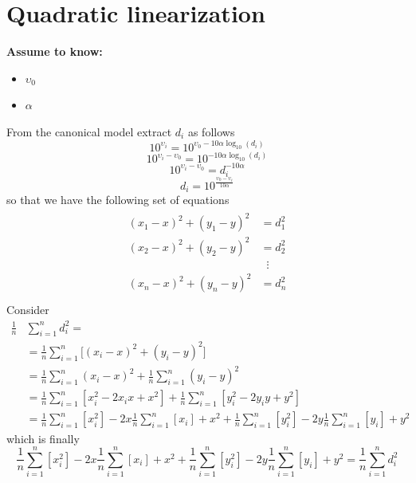 \documentclass[12pt,twoside]{report}
\begin{document}
\section{Quadratic linearization}
  \begin{center}
  \textbf{Assume to know:}
  \begin{itemize}
    \centering
    \item $\upsilon_0$
    \item $\alpha$
  \end{itemize}
  \end{center}
From the canonical model extract $d_i$ as follows
\begin{equation*}
    10^{\upsilon_{i}}=10^{\upsilon_0-10\alpha\log_{10}(d_i)}
\end{equation*}
\begin{equation*}
    10^{\upsilon_{i}-\upsilon_0}=10^{-10\alpha\log_{10}(d_i)}
\end{equation*}
\begin{equation*}
     10^{\upsilon_{i}-\upsilon_0}=d_i^{-10\alpha}
\end{equation*}
\begin{equation}
    d_i=10^{\frac{\upsilon_0-\upsilon_{i}}{10\alpha}}
    \label{eq:17}
\end{equation}
so that we have the following set of equations
\begin{align}
\begin{split} 
(x_1-x)^2+(y_1-y)^2&=d_1^2 \\ 
(x_2-x)^2+(y_2-y)^2&=d_2^2 \\ 
&\;\;\vdots\\
(x_n-x)^2+(y_n-y)^2&=d_n^2 \\
\end{split}
\label{eq:11}
\end{align}
Consider 
\begin{align}
\frac{1}{n}&\sum_{i=1}^nd_i^2=\\
&=\frac{1}{n}\sum_{i=1}^n\big[(x_i-x)^2+(y_i-y)^2\big]\\
&=\frac{1}{n}\sum_{i=1}^n(x_i-x)^2+\frac{1}{n}\sum_{i=1}^n(y_i-y)^2\\
&=\frac{1}{n}\sum_{i=1}^n[x_i^2-2x_ix+x^2] + \frac{1}{n}\sum_{i=1}^n[y_i^2-2y_iy+y^2]\\
&=\frac{1}{n}\sum_{i=1}^n[x_i^2]-2x\frac{1}{n}\sum_{i=1}^n[x_i]+ x^2 + \frac{1}{n}\sum_{i=1}^n[y_i^2]-2y\frac{1}{n}\sum_{i=1}^n[y_i]+ y^2
\end{align}
which is finally
\begin{equation}
    \frac{1}{n}\sum_{i=1}^n[x_i^2]-2x\frac{1}{n}\sum_{i=1}^n[x_i]+ x^2 + \frac{1}{n}\sum_{i=1}^n[y_i^2]-2y\frac{1}{n}\sum_{i=1}^n[y_i]+ y^2= \frac{1}{n}\sum_{i=1}^nd_i^2
    \label{eq:12}
\end{equation}
\end{document}
